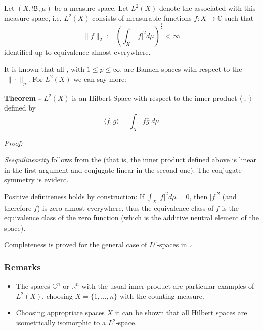 \documentclass[12pt]{article}
\begin{document}
Let $(X, \mathfrak{B}, \mu)$ be a measure space. Let $L^2(X)$ denote the  associated with this measure space, i.e. $L^2(X)$ consists of measurable functions $f:X \longrightarrow \mathbb{C}$ such that
\begin{displaymath}
\|f\|_2 := \left (\int_X |f|^2 d\mu \right)^{\frac{1}{2}} < \infty
\end{displaymath}
identified up to equivalence almost everywhere.

It is known that all , with $1\leq p \leq \infty$, are Banach spaces with respect to the  $\;\|\cdot\|_p$. For $L^2(X)$ we can say  more:

{\bf Theorem -} $L^2(X)$ is an Hilbert Space with respect to the inner product $\langle \cdot, \cdot \rangle$ defined by
\begin{displaymath}
\langle f, g \rangle = \int_X f\overline{g} \;d\mu
\end{displaymath}

\emph{Proof:}

 \emph{Sesquilinearity} follows from the  (that is, the inner product defined above is linear in the first argument and conjugate linear in the second one). The conjugate symmetry is evident.

Positive definiteness holds by construction: If $\int_X |f|^2 d\mu = 0$, then $|f|^2$ (and therefore $f$) is zero almost everywhere, thus the equivalence class of $f$ is the equivalence class of the zero function (which is the additive neutral element of the space).

Completeness is proved for the general case of $L^p$-spaces in .$\square$

\subsubsection{Remarks}
\begin{itemize}
\item The spaces $\mathbb{C}^n$ or $\mathbb{R}^n$ with the usual inner product are particular examples of $L^2(X)$, choosing $X = \{1, \dots, n\}$ with the counting measure.
\item Choosing appropriate spaces $X$ it can be shown that all Hilbert spaces are isometrically isomorphic to a $L^2$-space.
\end{itemize}
\end{document}
